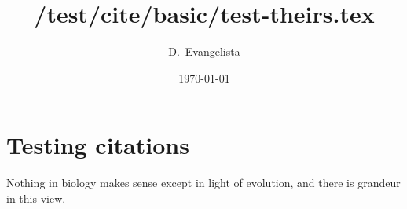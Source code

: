 \documentclass{tufte-handout}
\title{/test/cite/basic/test-theirs.tex}
\author{D.~Evangelista}
\date{\today}
\begin{document}
\maketitle

\section{Testing citations}
Nothing in biology makes sense except in light of evolution, and there is grandeur in this view\cite{dobzhansky:1973:nothing,darwin:1859:origin}. 



\end{document}
